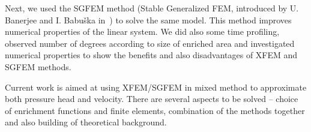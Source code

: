\documentclass{sna}
\begin{document}
Next, we used the SGFEM method (Stable Generalized FEM, introduced by U. Banerjee and I. Babu\v ska in~\cite{sgfem}) to solve the same model. This method improves
numerical properties of the linear system. We did also some time profiling, observed number of degrees according to size of enriched area and investigated 
numerical properties to show the benefits and also disadvantages of XFEM and SGFEM methods. 

Current work is aimed at using XFEM/SGFEM in mixed method to approximate both pressure head and velocity. There are several aspects to be solved -- choice
of enrichment functions and finite elements, combination of the methods together and also building of theoretical background.




\end{document}
